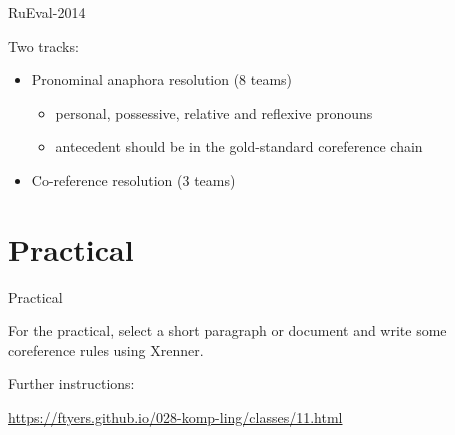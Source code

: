 \documentclass[dvipsnames, 10pt, compress]{beamer}
\begin{document}
\begin{frame}{RuEval-2014}

Two tracks:
\begin{itemize}
  \item Pronominal anaphora resolution (8 teams)
  \begin{itemize}
     \item personal, possessive, relative and reflexive pronouns
     \item antecedent should be in the gold-standard coreference chain
  \end{itemize}
  \item Co-reference resolution (3 teams)
\end{itemize}



\end{frame}

\section{Practical}

\begin{frame}{Practical}

For the practical, select a short paragraph or document and write some coreference rules 
using Xrenner.

Further instructions:

\url{https://ftyers.github.io/028-komp-ling/classes/11.html}

\end{frame}
\end{document}
